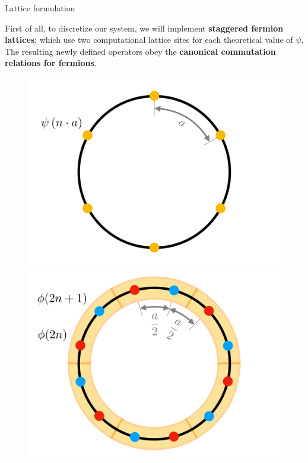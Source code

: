 \documentclass[9pt, handout, aspectratio=169]{beamer}	%
\begin{document}
\begin{frame}[allowframebreaks]{Lattice formulation}

	First of all, to discretize our system, we will implement \textbf{staggered fermion lattices}; which use two computational lattice sites for each theoretical value of $\psi$. The resulting newly defined operators obey the \textbf{canonical commutation relations for fermions}.

	\vspace{1em}

	\begin{figure}[!tbp]
		\centering
		\begin{minipage}[c]{.45\linewidth}
			\centering
			\includegraphics[width=\linewidth]{Figures/NJL1-model-solving/theoretical-fermion-lattice}
		\end{minipage}
	  \hspace{.025\linewidth}
		\begin{minipage}[c]{.45\linewidth}
			\centering
			\includegraphics[width=\linewidth]{Figures/NJL1-model-solving/computational-fermion-lattice}

\end{minipage}
\end{figure}
\end{frame}
\end{document}
